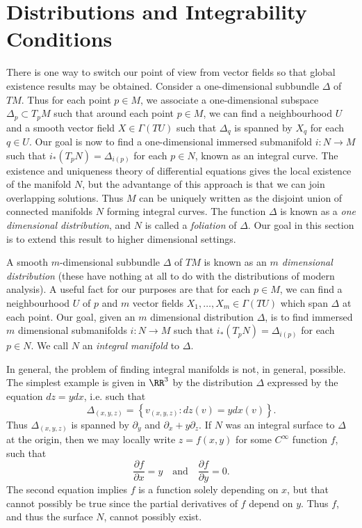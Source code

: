 \section{Distributions and Integrability Conditions}

There is one way to switch our point of view from vector fields so that global existence results may be obtained. Consider a one-dimensional subbundle $\Delta$ of $TM$. Thus for each point $p \in M$, we associate a one-dimensional subspace $\Delta_p \subset T_p M$ such that around each point $p \in M$, we can find a neighbourhood $U$ and a smooth vector field $X \in \Gamma(TU)$ such that $\Delta_q$ is spanned by $X_q$ for each $q \in U$. Our goal is now to find a one-dimensional immersed submanifold $i: N \to M$ such that $i_*(T_pN) = \Delta_{i(p)}$ for each $p \in N$, known as an integral curve. The existence and uniqueness theory of differential equations gives the local existence of the manifold $N$, but the advantange of this approach is that we can join overlapping solutions. Thus $M$ can be uniquely written as the disjoint union of connected manifolds $N$ forming integral curves. The function $\Delta$ is known as a \emph{one dimensional distribution}, and $N$ is called a \emph{foliation} of $\Delta$. Our goal in this section is to extend this result to higher dimensional settings.

A smooth $m$-dimensional subbundle $\Delta$ of $TM$ is known as an \emph{$m$ dimensional distribution} (these have nothing at all to do with the distributions of modern analysis). A useful fact for our purposes are that for each $p \in M$, we can find a neighbourhood $U$ of $p$ and $m$ vector fields $X_1, \dots, X_m \in \Gamma(TU)$ which span $\Delta$ at each point. Our goal, given an $m$ dimensional distribution $\Delta$, is to find immersed $m$ dimensional submanifolds $i: N \to M$ such that $i_*(T_p N) = \Delta_{i(p)}$ for each $p \in N$. We call $N$ an \emph{integral manifold} to $\Delta$.

In general, the problem of finding integral manifolds is not, in general, possible. The simplest example is given in $\RR^3$ by the distribution $\Delta$ expressed by the equation $dz = y dx$, i.e. such that
%
\[ \Delta_{(x,y,z)} = \left\{ v_{(x,y,z)}: dz(v) = y dx(v) \right\}. \]
%
Thus $\Delta_{(x,y,z)}$ is spanned by $\partial_y$ and $\partial_x + y \partial_z$. If $N$ was an integral surface to $\Delta$ at the origin, then we may locally write $z = f(x,y)$ for some $C^\infty$ function $f$, such that
%
\[ \frac{\partial f}{\partial x} = y \quad\text{and}\quad \frac{\partial f}{\partial y} = 0. \]
%
The second equation implies $f$ is a function solely depending on $x$, but that cannot possibly be true since the partial derivatives of $f$ depend on $y$. Thus $f$, and thus the surface $N$, cannot possibly exist.


